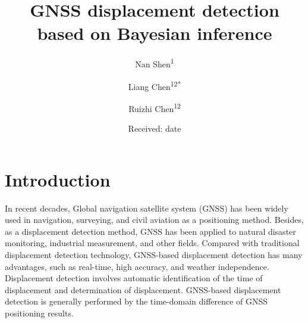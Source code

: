 \documentclass{svjour3}                     %
\begin{document}
\linenumbers
\title{GNSS displacement detection based on Bayesian inference
}



\author{Nan Shen\textsuperscript{1}\and
		Liang Chen\textsuperscript{12*}\and        
		Ruizhi Chen\textsuperscript{12} %
}



\date{Received: date }


\maketitle

\begin{abstract}

\end{abstract}

\section{Introduction}
\label{intro}
In recent decades, Global navigation satellite system (GNSS) has been widely used in navigation, surveying, and civil aviation as a positioning method. Besides, as a displacement detection method, GNSS has been applied to natural disaster monitoring, industrial measurement, and other fields. Compared with traditional displacement detection technology, GNSS-based displacement detection has many advantages, such as real-time, high accuracy, and weather independence. Displacement detection involves automatic identification of the time of displacement and determination of displacement. GNSS-based displacement detection is generally performed by the time-domain difference of GNSS positioning results.
\end{document}
